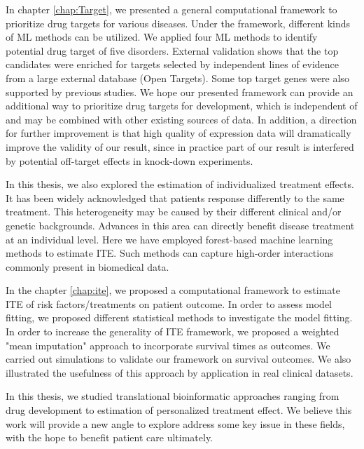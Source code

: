   In chapter \ref{chap:Target}, we presented a general computational framework to prioritize drug targets for various diseases. Under the framework, different kinds of ML methods can be utilized. We applied four ML methods to identify potential drug target of five disorders. External validation shows that the top candidates were enriched for targets selected by independent lines of evidence from a large external database (Open Targets). Some top target genes were also supported by previous studies. We hope our presented framework can provide an additional way to prioritize drug targets for development, which is independent of and may be combined with other existing sources of data. In addition, a direction for further improvement  is that high quality of expression data will dramatically improve the validity of our result, since in practice part of our result is interfered by potential off-target effects in knock-down experiments. 
  
  In this thesis, we also explored the estimation of individualized treatment effects. It has been widely acknowledged that patients response differently to the same treatment. This heterogeneity may be caused by their different clinical and/or genetic backgrounds. Advances in this area can directly benefit disease treatment at an individual level. Here we have employed forest-based machine learning methods  to estimate ITE. Such methods can capture high-order interactions commonly present in biomedical data.

  In the chapter \ref{chap:ite}, we proposed a computational framework to estimate ITE of risk factors/treatments on patient outcome. In order to assess model fitting, we proposed different statistical methods to investigate the model fitting. In order to increase the generality of ITE framework, we proposed a weighted "mean imputation" approach to incorporate survival times as outcomes. We carried out simulations to validate our framework on survival outcomes. We also illustrated the usefulness of this approach by application in real clinical datasets. 

  In this thesis, we studied translational bioinformatic approaches ranging from drug development to estimation of personalized treatment effect. We believe this work will provide a new angle to explore address some key issue in these fields, with the hope to benefit patient care ultimately.  
\chapterend

